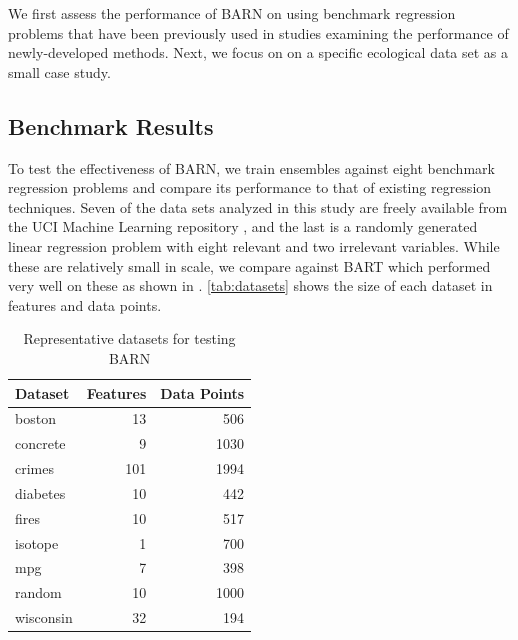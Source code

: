 \documentclass[12pt]{article}
\begin{document}
We first assess the performance of BARN on using benchmark regression problems that have been previously used in studies examining the performance of newly-developed methods. Next, we focus on on a specific ecological data set as a small case study.

\subsection{Benchmark Results}\label{subsec:res}

To test the effectiveness of BARN, we train ensembles against eight benchmark regression problems and compare its performance to that of existing regression techniques.  Seven of the data sets analyzed in this study are freely available from the UCI Machine Learning repository \cite{Dua:2019}, and the last is a randomly generated linear regression problem with eight relevant and two irrelevant variables.  While these are relatively small in scale, we compare against BART which performed very well on these as shown in \cite{biau2019neural}.  \autoref{tab:datasets} shows the size of each dataset in features and data points.

\begin{table}[htb]
\centering
\caption{Representative datasets for testing BARN}
\begin{tabular}{lrr}
Dataset & Features & Data Points\\ \hline
boston & 13 & 506\\
concrete & 9 & 1030\\
crimes & 101 & 1994\\
diabetes & 10 & 442 \\
fires & 10 & 517\\
isotope & 1 & 700 \\
mpg & 7 & 398\\
random & 10 & 1000 \\
wisconsin & 32 & 194\\
\end{tabular}
    \label{tab:datasets}
\end{table}
\end{document}
